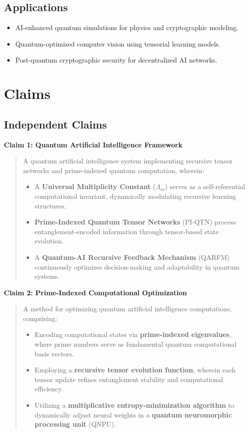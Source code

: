\documentclass{article}
\theoremstyle{plain}
\begin{document}
\subsection{Applications}
\begin{itemize}
    \item AI-enhanced quantum simulations for physics and cryptographic modeling.
    \item Quantum-optimized computer vision using tensorial learning models.
    \item Post-quantum cryptographic security for decentralized AI networks.
\end{itemize}

\section{Claims}

\subsection{Independent Claims}

\textbf{Claim 1: Quantum Artificial Intelligence Framework}
\begin{quote}
A quantum artificial intelligence system implementing recursive tensor networks and prime-indexed quantum computation, wherein:
\begin{itemize}
    \item A \textbf{Universal Multiplicity Constant} ($\Lambda_m$) serves as a self-referential computational invariant, dynamically modulating recursive learning structures.
    \item \textbf{Prime-Indexed Quantum Tensor Networks} (PI-QTN) process entanglement-encoded information through tensor-based state evolution.
    \item A \textbf{Quantum-AI Recursive Feedback Mechanism} (QARFM) continuously optimizes decision-making and adaptability in quantum systems.
\end{itemize}
\end{quote}

\textbf{Claim 2: Prime-Indexed Computational Optimization}
\begin{quote}
A method for optimizing quantum artificial intelligence computations, comprising:
\begin{itemize}
    \item Encoding computational states via \textbf{prime-indexed eigenvalues}, where prime numbers serve as fundamental quantum computational basis vectors.
    \item Employing a \textbf{recursive tensor evolution function}, wherein each tensor update refines entanglement stability and computational efficiency.
    \item Utilizing a \textbf{multiplicative entropy-minimization algorithm} to dynamically adjust neural weights in a \textbf{quantum neuromorphic processing unit} (QNPU).
\end{itemize}
\end{quote}
\end{document}
